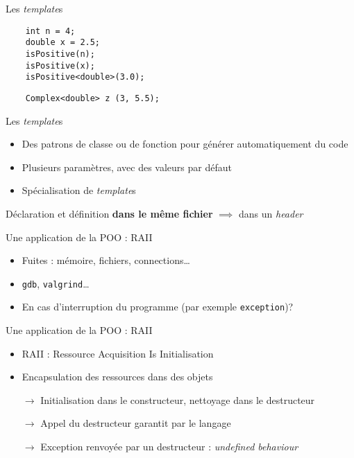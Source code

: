 \begin{frame}[fragile]{Les \textit{template}s}
  \begin{lstlisting}
    int n = 4;
    double x = 2.5;
    isPositive(n);
    isPositive(x);
    isPositive<double>(3.0);
  \end{lstlisting}

  \begin{lstlisting}
    Complex<double> z (3, 5.5);
  \end{lstlisting}
\end{frame}

\begin{frame}{Les \textit{template}s}
  \begin{itemize}
  \item  Des patrons de classe ou de fonction pour générer automatiquement du code
  \item Plusieurs paramètres, avec des valeurs par défaut
  \item Spécialisation de \textit{template}s
  \end{itemize}

  Déclaration et définition \textbf{dans le même fichier} $\implies$ dans un \textit{header}
\end{frame}

\begin{frame}{Une application de la POO : RAII}
  \begin{itemize}
  \item Fuites : mémoire, fichiers, connections\dots{}
  \item \texttt{gdb}, \texttt{valgrind}\dots{}
  \item En cas d'interruption du programme (par exemple \texttt{exception})?
  \end{itemize}
\end{frame}

\begin{frame}{Une application de la POO : RAII}
  \begin{itemize}
  \item RAII : Ressource Acquisition Is Initialisation
  \item Encapsulation des ressources dans des objets
  \item[$\rightarrow$] Initialisation dans le constructeur, nettoyage dans le destructeur
  \item[$\rightarrow$] Appel du destructeur garantit par le langage
  \item[$\rightarrow$] Exception renvoyée par un destructeur : \textit{undefined behaviour}
  \end{itemize}
\end{frame}
